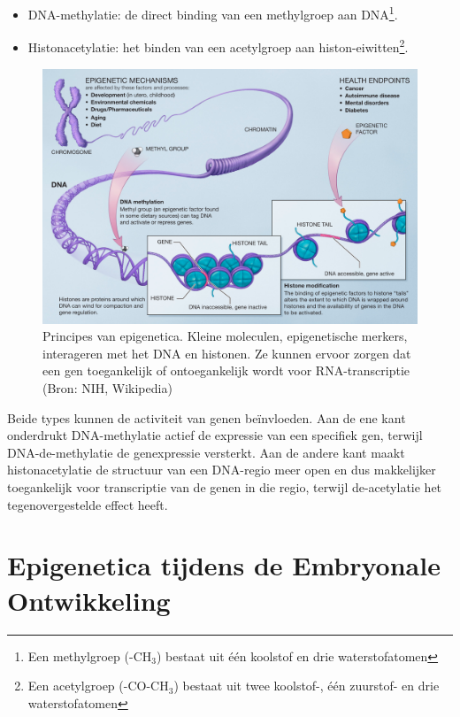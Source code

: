 \documentclass[
  11pt,
]{book}
\providecommand{\tightlist}{%
  \setlength{\itemsep}{0pt}\setlength{\parskip}{0pt}}
\begin{document}
\begin{itemize}
\tightlist
\item
  DNA-methylatie: de direct binding van een methylgroep aan DNA\footnote{Een methylgroep (-CH\(_3\)) bestaat uit één koolstof en drie waterstofatomen}.
\item
  Histonacetylatie: het binden van een acetylgroep aan histon-eiwitten\footnote{Een acetylgroep (-CO-CH\(_3\)) bestaat uit twee koolstof-, één zuurstof- en drie waterstofatomen}.
\end{itemize}

\begin{figure}

{\centering \includegraphics[width=1\linewidth]{./figs/Epigenetic_mechanisms} 

}

\caption{Principes van epigenetica. Kleine moleculen, epigenetische merkers, interageren met het DNA en histonen. Ze kunnen ervoor zorgen dat een gen toegankelijk of ontoegankelijk wordt voor RNA-transcriptie (Bron: NIH, Wikipedia)}\label{fig:epigenetics}
\end{figure}

Beide types kunnen de activiteit van genen beïnvloeden. Aan de ene kant onderdrukt DNA-methylatie actief de expressie van een specifiek gen, terwijl DNA-de-methylatie de genexpressie versterkt. Aan de andere kant maakt histonacetylatie de structuur van een DNA-regio meer open en dus makkelijker toegankelijk voor transcriptie van de genen in die regio, terwijl de-acetylatie het tegenovergestelde effect heeft.

\hypertarget{epigenetica-tijdens-de-embryonale-ontwikkeling}{%
\section{Epigenetica tijdens de Embryonale Ontwikkeling}\label{epigenetica-tijdens-de-embryonale-ontwikkeling}}
\end{document}
